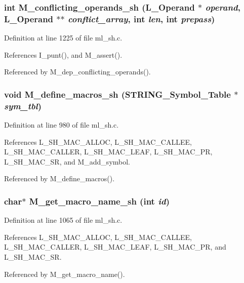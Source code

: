\subsubsection{\setlength{\rightskip}{0pt plus 5cm}int M\_\-conflicting\_\-operands\_\-sh (L\_\-Operand $\ast$ {\em operand}, L\_\-Operand $\ast$$\ast$ {\em conflict\_\-array}, int {\em len}, int {\em prepass})}\label{ml__sh_8c_d2727b3ac02e4028cefb7ad7a021ae0a}




Definition at line 1225 of file ml\_\-sh.c.

References I\_\-punt(), and M\_\-assert().

Referenced by M\_\-dep\_\-conflicting\_\-operands().
\subsubsection{\setlength{\rightskip}{0pt plus 5cm}void M\_\-define\_\-macros\_\-sh (\bf{STRING\_\-Symbol\_\-Table} $\ast$ {\em sym\_\-tbl})}\label{ml__sh_8c_e9100476b339222b55e32457d5f1ae1a}




Definition at line 980 of file ml\_\-sh.c.

References L\_\-SH\_\-MAC\_\-ALLOC, L\_\-SH\_\-MAC\_\-CALLEE, L\_\-SH\_\-MAC\_\-CALLER, L\_\-SH\_\-MAC\_\-LEAF, L\_\-SH\_\-MAC\_\-PR, L\_\-SH\_\-MAC\_\-SR, and M\_\-add\_\-symbol.

Referenced by M\_\-define\_\-macros().
\subsubsection{\setlength{\rightskip}{0pt plus 5cm}char$\ast$ M\_\-get\_\-macro\_\-name\_\-sh (int {\em id})}\label{ml__sh_8c_f24bd33e76bbaed279abf488b0706bb2}




Definition at line 1065 of file ml\_\-sh.c.

References L\_\-SH\_\-MAC\_\-ALLOC, L\_\-SH\_\-MAC\_\-CALLEE, L\_\-SH\_\-MAC\_\-CALLER, L\_\-SH\_\-MAC\_\-LEAF, L\_\-SH\_\-MAC\_\-PR, and L\_\-SH\_\-MAC\_\-SR.

Referenced by M\_\-get\_\-macro\_\-name().

